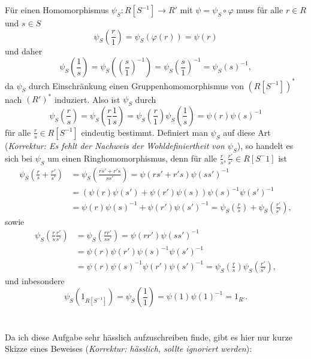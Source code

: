 \documentclass[a4paper,10pt]{article}
\theoremstyle{definition}
\begin{document}
Für einen Homomorphismus $\psi_S : R[S^{-1}] \rightarrow R'$ mit $\psi = \psi_S \circ \varphi$ muss für alle $r \in R$ und $s \in S$
\[
 \psi_S\left(\frac{r}{1}\right)
 = \psi_S( \varphi(r) )
 = \psi(r)
\]
und daher
\[
 \psi_S\left(\frac{1}{s}\right)
 = \psi_S\left( \left (\frac{s}{1} \right)^{-1} \right)
 = \psi_S\left( \frac{s}{1} \right)^{-1}
 = \psi_S(s)^{-1},
\]
da $\psi_S$ durch Einschränkung einen Gruppenhomomorphismus von $(R[S^{-1}])^*$ nach $(R')^*$ induziert. Also ist $\psi_S$ durch
\[
 \psi_S\left(\frac{r}{s}\right)
 = \psi_S\left(\frac{r}{1} \frac{1}{s}\right)
 = \psi_S\left(\frac{r}{1}\right) \psi_S\left(\frac{1}{s}\right)
 = \psi(r)\psi(s)^{-1}
\]
für alle $\frac{r}{s} \in R[S^{-1}]$ eindeutig bestimmt. Definiert man $\psi_S$ auf diese Art (\emph{Korrektur: Es fehlt der Nachweis der Wohldefiniertheit von $\psi_S$}), so handelt es sich bei $\psi_S$ um einen Ringhomomorphismus, denn für alle $\frac{r}{s}, \frac{r'}{s'} \in R[S^-1]$ ist
\begin{align*}
 \psi_S\left( \frac{r}{s} + \frac{r'}{s'} \right)
 &= \psi_S\left( \frac{rs' + r's}{ss'} \right)
 = \psi(rs' + r's)\psi(ss')^{-1} \\
 &= \left( \psi(r)\psi(s') + \psi(r')\psi(s) \right) \psi(s)^{-1}\psi(s')^{-1} \\
 &= \psi(r)\psi(s)^{-1} + \psi(r')\psi(s')^{-1}
 = \psi_S\left(\frac{r}{s}\right) + \psi_S\left(\frac{r'}{s'}\right),
\end{align*}
sowie
\begin{align*}
 \psi_S\left(\frac{r}{s} \frac{r'}{s'}\right)
 &= \psi_S\left(\frac{rr'}{ss'}\right)
 = \psi(rr')\psi(ss')^{-1} \\
 &= \psi(r)\psi(r')\psi(s)^{-1}\psi(s')^{-1} \\
 &= \psi(r)\psi(s)^{-1} \psi(r')\psi(s')^{-1}
 = \psi_S\left(\frac{r}{s}\right) \psi_S\left(\frac{r'}{s'}\right),
\end{align*}
und inbesondere
\[
 \psi_S\left(1_{R[S^{-1}]}\right)
 = \psi_S\left(\frac{1}{1}\right)
 = \psi(1) \psi(1)^{-1}
 = 1_{R'}.
\]





\section{}
Da ich diese Aufgabe sehr hässlich aufzuschreiben finde, gibt es hier nur kurze Skizze eines Beweises (\emph{Korrektur: hässlich, sollte ignoriert werden}):
\end{document}
